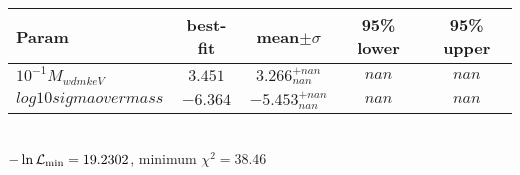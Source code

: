 \begin{tabular}{|l|c|c|c|c|} 
 \hline 
Param & best-fit & mean$\pm\sigma$ & 95\% lower & 95\% upper \\ \hline 
$10^{-1}M_{wdm keV }$ &$3.451$ & $3.266_{nan}^{+nan}$ & $nan$ & $nan$ \\ 
$log10sigmaovermass$ &$-6.364$ & $-5.453_{nan}^{+nan}$ & $nan$ & $nan$ \\ 
\hline 
 \end{tabular} \\ 
$-\ln{\cal L}_\mathrm{min} =19.2302$, minimum $\chi^2=38.46$ \\ 
